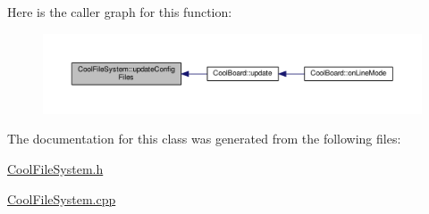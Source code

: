 Here is the caller graph for this function\+:
\nopagebreak
\begin{figure}[H]
\begin{center}
\leavevmode
\includegraphics[width=350pt]{classCoolFileSystem_a32dad79ae80182a83e2e8f52286b7c7b_icgraph}
\end{center}
\end{figure}


The documentation for this class was generated from the following files\+:\begin{DoxyCompactItemize}
\item 
\hyperlink{CoolFileSystem_8h}{Cool\+File\+System.\+h}\item 
\hyperlink{CoolFileSystem_8cpp}{Cool\+File\+System.\+cpp}\end{DoxyCompactItemize}
